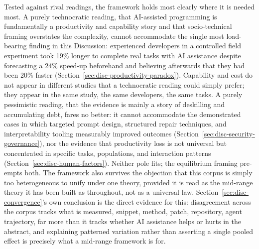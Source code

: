 Tested against rival readings, the framework holds most clearly where it is needed most. A purely technocratic reading, that AI-assisted programming is fundamentally a productivity and capability story and that socio-technical framing overstates the complexity, cannot accommodate the single most load-bearing finding in this Discussion: experienced developers in a controlled field experiment took 19\% longer to complete real tasks with AI assistance despite forecasting a 24\% speed-up beforehand and believing afterwards that they had been 20\% faster (Section~\ref{sec:disc-productivity-paradox}). Capability and cost do not appear in different studies that a technocratic reading could simply prefer; they appear in the same study, the same developers, the same tasks. A purely pessimistic reading, that the evidence is mainly a story of deskilling and accumulating debt, fares no better: it cannot accommodate the demonstrated cases in which targeted prompt design, structured repair techniques, and interpretability tooling measurably improved outcomes (Section~\ref{sec:disc-security-governance}), nor the evidence that productivity loss is not universal but concentrated in specific tasks, populations, and interaction patterns (Section~\ref{sec:disc-human-factors}). Neither pole fits; the equilibrium framing pre-empts both. The framework also survives the objection that this corpus is simply too heterogeneous to unify under one theory, provided it is read as the mid-range theory it has been built as throughout, not as a universal law. Section~\ref{sec:disc-convergence}'s own conclusion is the direct evidence for this: disagreement across the corpus tracks what is measured, snippet, method, patch, repository, agent trajectory, far more than it tracks whether AI assistance helps or hurts in the abstract, and explaining patterned variation rather than asserting a single pooled effect is precisely what a mid-range framework is for.

